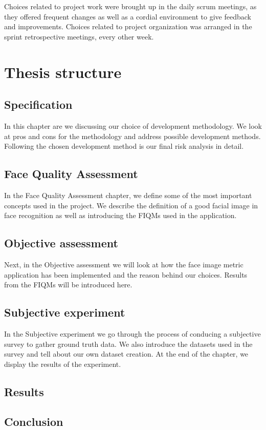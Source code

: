 Choices related to project work were brought up in the daily scrum meetings, as they offered frequent changes as well as a cordial environment to give feedback and improvements. Choices related to project organization was arranged in the sprint retrospective meetings, every other week. 


\section{Thesis structure}
\subsection*{Specification}
In this chapter are we discussing our choice of development methodology. We look at pros and cons for the methodology and address possible development methods. Following the chosen development method is our final risk analysis in detail. 

\subsection*{Face Quality Assessment}
In the Face Quality Assessment chapter, we define some of the most important concepts used in the project. We describe the definition of a good facial image in face recognition as well as introducing the FIQMs used in the application. 

\subsection*{Objective assessment}
Next, in the Objective assessment we will look at how the face image metric application has been implemented and the reason behind our choices. Results from the FIQMs will be introduced here.  

\subsection*{Subjective experiment}
In the Subjective experiment we go through the process of conducing a subjective survey to gather ground truth data. We also introduce the datasets used in the survey and tell about our own dataset creation. At the end of the chapter, we display the results of the experiment. 

\subsection*{Results}
\subsection*{Conclusion}


